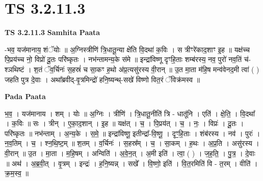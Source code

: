\documentclass[17pt]{extarticle}
\begin{document}

\section{ TS 3.2.11.3 }

\textbf{TS 3.2.11.3 } \newline
\textbf{Samhita Paata} \newline

-भव॒ यज॑मानाय॒ शंॅयोः ॥ अ॒ग्निस्त्रीणि॑ त्रि॒धातू॒न्या क्षे॑ति वि॒दथा॑ क॒विः । स त्रीꣳरे॑काद॒शाꣳ इ॒ह ॥ यक्ष॑च्च पि॒प्रय॑च्च नो॒ विप्रो॑ दू॒तः परि॑ष्कृतः । नभ॑न्तामन्य॒के स॑मे ॥ इन्द्रा॑विष्णू दृꣳहि॒ताः शम्ब॑रस्य॒ नव॒ पुरो॑ नव॒तिं च॑- श्ञथिष्टं । श॒तं ॅव॒र्चिनः॑ स॒हस्रं॑ च सा॒कꣳ ह॒थो अ॑प्र॒त्यसु॑रस्य वी॒रान् ॥ उ॒त मा॒ता म॑हि॒ष मन्व॑वेनद॒मी त्वा॑ ( ) जहति पुत्र दे॒वाः । अथा᳚ब्रवीद्-वृ॒त्रमिन्द्रो॑ हनि॒ष्यन्थ्-सखे॑ विष्णो वित॒रं ॅविक्र॑मस्व ॥ \newline

\textbf{Pada Paata} \newline

भ॒व॒ । यज॑मानाय । शम् । योः ॥ अ॒ग्निः । त्रीणि॑ । त्रि॒धातू॒नीति॑ त्रि - धातू॑नि । एति॑ । क्षे॒ति॒ । वि॒दथा᳚ । क॒विः ॥ सः । त्रीन् । ए॒का॒द॒शान् । इ॒ह ॥ यक्ष॑त् । च॒ । पि॒प्रय॑त् । च॒ । नः॒ । विप्रः॑ । दू॒तः । परि॑ष्कृतः ॥ नभ॑न्ताम् । अ॒न्य॒के । स॒मे॒ ॥ इन्द्रा॑विष्णू॒ इतीन्द्रा᳚-वि॒ष्णू॒ । दृꣳ॒॒हि॒ताः । शंब॑रस्य । नव॑ । पुरः॑ । न॒व॒तिम् । च॒ । श्न॒थि॒ष्ट॒म् ॥ श॒तम् । व॒र्चिनः॑ । स॒हस्र᳚म् । च॒ । सा॒कम् । ह॒थः । अ॒प्र॒ति । असु॑रस्य । वी॒रान् ॥ उ॒त । मा॒ता । म॒हि॒षम् । अन्विति॑ । अ॒वे॒न॒त् । अ॒मी इति॑ । त्वा॒ ( ) । ज॒ह॒ति॒ । पु॒त्र॒ । दे॒वाः ॥ अथ॑ । अ॒ब्र॒वी॒त् । वृ॒त्रम् । इन्द्रः॑ । ह॒नि॒ष्यन्न् । सखे᳚ । वि॒ष्णो॒ इति॑ । वि॒त॒रमिति॑ वि - त॒रम् । वीति॑ । क्र॒म॒स्व॒ ॥  \newline
\end{document}
